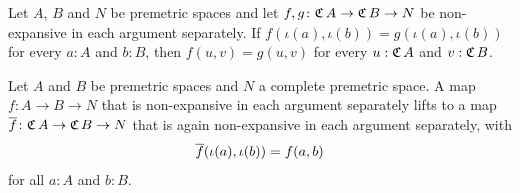 \begin{corollary}
  \label{nonExpansive2Eq}
  Let $A$, $B$ and $N$ be premetric spaces and let $f, g \colon \mathfrak{C}\,A \to \mathfrak{C}\,B \to N$ be non-expansive in each argument separately. If $f(\iota(a), \iota(b)) = g(\iota(a), \iota(b))$ for every $a : A$ and $b : B$, then $f(u, v) = g(u, v)$ for every $u : \mathfrak{C}\,A$ and $v : \mathfrak{C}\,B$.
\end{corollary}

\begin{theorem}
  \label{liftNE2}
  Let $A$ and $B$ be premetric spaces and $N$ a complete premetric space. A map $f \colon A \to B \to N$ that is non-expansive in each argument separately lifts to a map $\overline{f} \colon \mathfrak{C}\,A \to \mathfrak{C}\,B \to N$ that is again non-expansive in each argument separately, with
  \[
    \overline{f}(\iota(a), \iota(b)) = f(a, b)
  \]
  for all $a : A$ and $b : B$.
\end{theorem}
